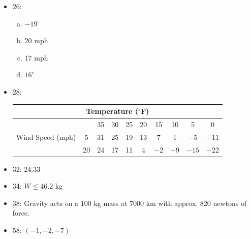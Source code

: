 \documentclass[10pt]{extarticle}
\begin{document}
\begin{problem}{12.1}
\begin{itemize}
\begin{center}
        \end{center}
      \item 26:
        \begin{enumerate}[(a)]
          \item $-19^{\circ}$
          \item $20$ mph
          \item $17$ mph
          \item $16^{\circ}$
        \end{enumerate}
      \item 28:
        \begin{center}
          \renewcommand{\arraystretch}{1.5}
          \begin{tabular}{|c||c||c|c|c|c|c|c|c|c|}
            \hline
            \multicolumn{10}{|c|}{Temperature ($^{\circ}$F)}\\
            \hline
            \multirow{3}{7em}{Wind Speed (mph)}&& 35 & 30 & 25 & 20 & 15 & 10 & 5 & 0 \\
            \cline{3-10}
            & 5 & 31 & 25 & 19 & 13 & 7 & 1 & $-5$ & $-11$\\
                                               & 20 & 24 & 17 & 11 & 4 & $-2$ & $-9$ & $-15$ & $-22$\\
                                               \hline
          \end{tabular}
        \end{center}
        \item 32: $24.33$
        \item 34: $W\leq 46.2$ kg
        \item 38: Gravity acts on a $100$ kg mass at $7000$ km with approx. 820 newtons of force.
        \item 58: $(-1,-2,-7)$
    \end{itemize}
  \end{problem}
\end{document}
